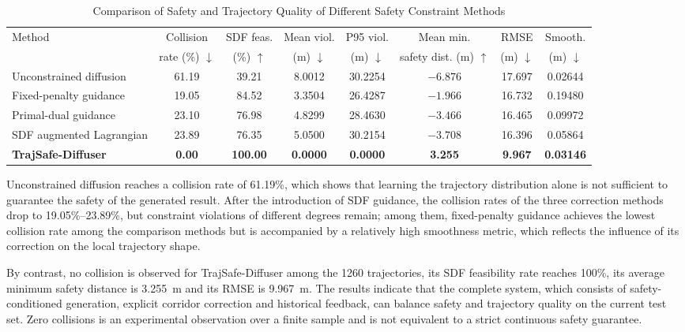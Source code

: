 \documentclass[journal]{IEEEtran}
\begin{document}
\begin{table}[!t]
\centering
\caption{Comparison of Safety and Trajectory Quality of Different Safety Constraint Methods}
\label{tab:compare}
\footnotesize
\setlength{\tabcolsep}{4.5pt}
\begin{tabular}{lccccccc}
\toprule
\multirow{2}{*}{Method} & Collision & SDF feas. & Mean viol. & P95 viol. & Mean min. & RMSE & Smooth.\\
 & rate (\%) $\downarrow$ & (\%) $\uparrow$ & (m) $\downarrow$ & (m) $\downarrow$ & safety dist. (m) $\uparrow$ & (m) $\downarrow$ & (m) $\downarrow$\\
\midrule
Unconstrained diffusion        & 61.19 &  39.21 & 8.0012 & 30.2254 & $-6.876$ & 17.697 & 0.02644\\
Fixed-penalty guidance         & 19.05 &  84.52 & 3.3504 & 26.4287 & $-1.966$ & 16.732 & 0.19480\\
Primal-dual guidance           & 23.10 &  76.98 & 4.8299 & 28.4630 & $-3.466$ & 16.465 & 0.09972\\
SDF augmented Lagrangian       & 23.89 &  76.35 & 5.0500 & 30.2154 & $-3.708$ & 16.396 & 0.05864\\[2pt]
\textbf{TrajSafe-Diffuser}     & \textbf{0.00} & \textbf{100.00} & \textbf{0.0000} & \textbf{0.0000} & \textbf{3.255} & \textbf{9.967} & \textbf{0.03146}\\
\bottomrule
\end{tabular}
\end{table}

Unconstrained diffusion reaches a collision rate of 61.19\%, which shows that learning the trajectory distribution alone is not sufficient to guarantee the safety of the generated result. After the introduction of SDF guidance, the collision rates of the three correction methods drop to 19.05\%--23.89\%, but constraint violations of different degrees remain; among them, fixed-penalty guidance achieves the lowest collision rate among the comparison methods but is accompanied by a relatively high smoothness metric, which reflects the influence of its correction on the local trajectory shape.

By contrast, no collision is observed for TrajSafe-Diffuser among the 1260 trajectories, its SDF feasibility rate reaches 100\%, its average minimum safety distance is 3.255~m and its RMSE is 9.967~m. The results indicate that the complete system, which consists of safety-conditioned generation, explicit corridor correction and historical feedback, can balance safety and trajectory quality on the current test set. Zero collisions is an experimental observation over a finite sample and is not equivalent to a strict continuous safety guarantee.
\end{document}
